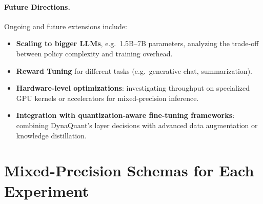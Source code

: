 \documentclass{article}
\begin{document}
	
	\paragraph{Future Directions.}
	Ongoing and future extensions include:
	\begin{itemize}
		\item \textbf{Scaling to bigger LLMs}, e.g.\ 1.5B–7B parameters, analyzing the trade-off between policy complexity and training overhead.
		\item \textbf{Reward Tuning} for different tasks (e.g.\ generative chat, summarization).
		\item \textbf{Hardware-level optimizations}: investigating throughput on specialized GPU kernels or accelerators for mixed-precision inference.
		\item \textbf{Integration with quantization-aware fine-tuning frameworks}: combining DynaQuant's layer decisions with advanced data augmentation or knowledge distillation.
	\end{itemize}
	
	\balance
	
	
	
	\clearpage
	\appendix
	\section{Mixed-Precision Schemas for Each Experiment}
	\label{sec:appendix-schemas}
	
\end{document}

